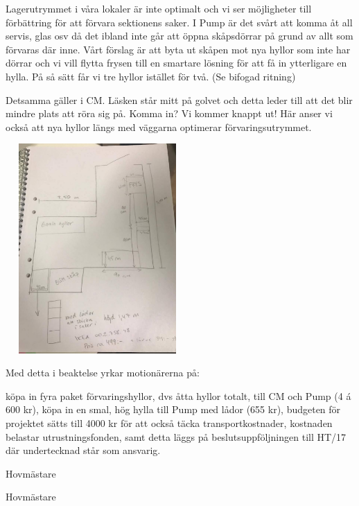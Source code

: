 \documentclass[../_main/handlingar.tex]{subfiles}
\begin{document}

Lagerutrymmet i våra lokaler är inte optimalt och vi ser möjligheter till förbättring för att förvara sektionens saker. I Pump är det svårt att komma åt all servis, glas osv då det ibland inte går att öppna skåpsdörrar på grund av allt som förvaras där inne. Vårt förslag är att byta ut skåpen mot nya hyllor som inte har dörrar och vi vill flytta frysen till en smartare lösning för att få in ytterligare en hylla. På så sätt får vi tre hyllor istället för två. (Se bifogad ritning)

Detsamma gäller i CM. Läsken står mitt på golvet och detta leder till att det blir mindre plats att röra sig på. Komma in? Vi kommer knappt ut! Här anser vi också att nya hyllor längs med väggarna optimerar förvaringsutrymmet.

\begin{center}
\includegraphics[width=7cm,height=8cm]{lager.png}
\end{center}

Med detta i beaktelse yrkar motionärerna på:
\begin{attsatser}
    \att köpa in fyra paket förvaringshyllor, dvs åtta hyllor totalt, till CM och Pump (4 á 600 kr),
    \att köpa in en smal, hög hylla till Pump med lådor (655 kr),
    \att budgeten för projektet sätts till 4000 kr för att också täcka transportkostnader,
    \att kostnaden belastar utrustningsfonden, samt
    \att detta läggs på beslutsuppföljningen till HT/17 där undertecknad står som ansvarig.
\end{attsatser}

\begin{signatures}{2}
    \mvh
    \signature{Sanna Nordberg}{Hovmästare}
    \signature{Matilda Dahlström}{Hovmästare}
\end{signatures}
\end{document}

